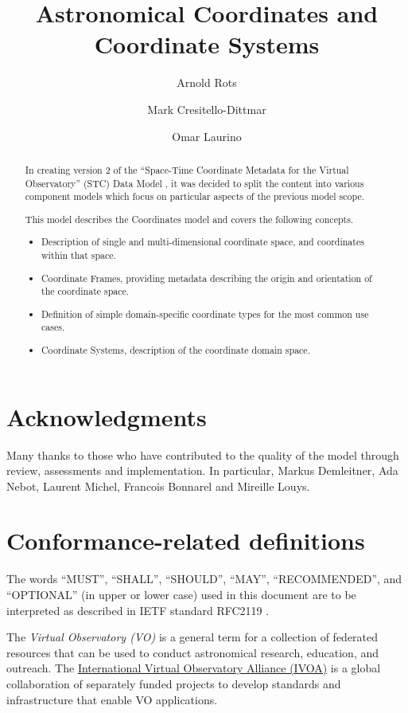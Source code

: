 \documentclass[11pt,a4paper]{ivoa}
\title{Astronomical Coordinates and Coordinate Systems}
\author{Arnold Rots}
\author{Mark Cresitello-Dittmar}
\author{Omar Laurino}
\begin{document}
\begin{abstract}
  In creating version 2 of the ``Space-Time Coordinate Metadata for the Virtual Observatory'' (STC) Data Model \citep{2007ivoa.spec.1030R}, it was decided to split the content into various component models which focus on particular aspects of the previous model scope.  
  
  This model describes the Coordinates model and covers the following concepts.
  \begin{itemize}
  \item Description of single and multi-dimensional coordinate space, and coordinates within that space.
  \item Coordinate Frames, providing metadata describing the origin and orientation of the coordinate space.
  \item Definition of simple domain-specific coordinate types for the most common use cases.
  \item Coordinate Systems, description of the coordinate domain space.
  \end{itemize}
\end{abstract}


\section*{Acknowledgments}
Many thanks to those who have contributed to the quality of the model through review, assessments and implementation.
In particular, Markus Demleitner, Ada Nebot, Laurent Michel, Francois Bonnarel and Mireille Louys.


\section*{Conformance-related definitions}

The words ``MUST'', ``SHALL'', ``SHOULD'', ``MAY'', ``RECOMMENDED'', and
``OPTIONAL'' (in upper or lower case) used in this document are to be
interpreted as described in IETF standard RFC2119 \citep{std:RFC2119}.

The \emph{Virtual Observatory (VO)} is a
general term for a collection of federated resources that can be used
to conduct astronomical research, education, and outreach.
The \href{http://www.ivoa.net}{International
Virtual Observatory Alliance (IVOA)} is a global
collaboration of separately funded projects to develop standards and
infrastructure that enable VO applications.


\end{document}
